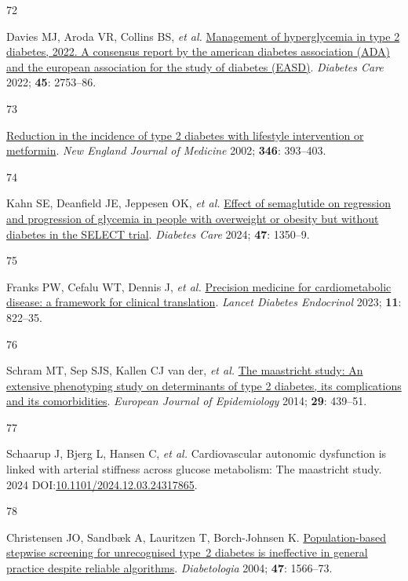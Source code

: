 \documentclass[
  a4paper,
  headsepline=true,
  open=any]{scrbook}
\newlength{\cslhangindent}
\newlength{\csllabelwidth}
\newlength{\cslentryspacingunit} %
\newenvironment{CSLReferences}[2] %
 {%
  \setlength{\parindent}{0pt}
  \ifodd #1
  \let\oldpar\par
  \def\par{\hangindent=\cslhangindent\oldpar}
  \fi
  \setlength{\parskip}{#2\cslentryspacingunit}
 }%
 {}
\newcommand{\CSLLeftMargin}[1]{\parbox[t]{\csllabelwidth}{#1}}
\newcommand{\CSLRightInline}[1]{\parbox[t]{\linewidth - \csllabelwidth}{#1}\break}
\begin{document}
\begin{CSLReferences}{0}{0}
\leavevmode{}%
\CSLLeftMargin{72 }%
\CSLRightInline{Davies MJ, Aroda VR, Collins BS, \emph{et al.}
\href{https://doi.org/10.2337/dci22-0034}{Management of hyperglycemia in
type 2 diabetes, 2022. A consensus report by the american diabetes
association (ADA) and the european association for the study of diabetes
(EASD)}. \emph{Diabetes Care} 2022; \textbf{45}: 2753--86.}

\leavevmode{}%
\CSLLeftMargin{73 }%
\CSLRightInline{\href{https://doi.org/10.1056/NEJMoa012512}{Reduction in
the incidence of type 2 diabetes with lifestyle intervention or
metformin}. \emph{New England Journal of Medicine} 2002; \textbf{346}:
393--403.}

\leavevmode{}%
\CSLLeftMargin{74 }%
\CSLRightInline{Kahn SE, Deanfield JE, Jeppesen OK, \emph{et al.}
\href{https://doi.org/10.2337/dc24-0491}{Effect of semaglutide on
regression and progression of glycemia in people with overweight or
obesity but without diabetes in the SELECT trial}. \emph{Diabetes Care}
2024; \textbf{47}: 1350--9.}

\leavevmode{}%
\CSLLeftMargin{75 }%
\CSLRightInline{Franks PW, Cefalu WT, Dennis J, \emph{et al.}
\href{https://doi.org/10.1016/s2213-8587(23)00165-1}{Precision medicine
for cardiometabolic disease: a framework for clinical translation}.
\emph{Lancet Diabetes Endocrinol} 2023; \textbf{11}: 822--35.}

\leavevmode{}%
\CSLLeftMargin{76 }%
\CSLRightInline{Schram MT, Sep SJS, Kallen CJ van der, \emph{et al.}
\href{https://doi.org/10.1007/s10654-014-9889-0}{The maastricht study:
An extensive phenotyping study on determinants of type 2 diabetes, its
complications and its comorbidities}. \emph{European Journal of
Epidemiology} 2014; \textbf{29}: 439--51.}

\leavevmode{}%
\CSLLeftMargin{77 }%
\CSLRightInline{Schaarup J, Bjerg L, Hansen C, \emph{et al.}
Cardiovascular autonomic dysfunction is linked with arterial stiffness
across glucose metabolism: The maastricht study. 2024
DOI:\href{https://doi.org/10.1101/2024.12.03.24317865}{10.1101/2024.12.03.24317865}.}

\leavevmode{}%
\CSLLeftMargin{78 }%
\CSLRightInline{Christensen JO, Sandbæk A, Lauritzen T, Borch-Johnsen K.
\href{https://doi.org/10.1007/s00125-004-1496-2}{Population-based
stepwise screening for unrecognised type~2 diabetes is ineffective in
general practice despite reliable algorithms}. \emph{Diabetologia} 2004;
\textbf{47}: 1566--73.}


\end{CSLReferences}
\end{document}
